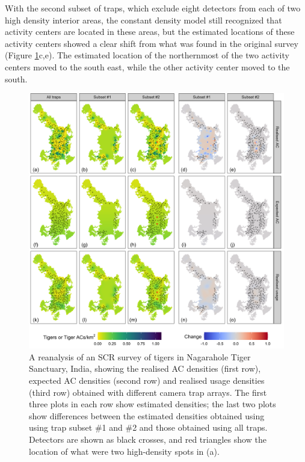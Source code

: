 \documentclass[useAMS,usenatbib,referee]{biom}
\begin{document}
With the second subset of traps, which exclude eight detectors from each of two high density interior areas, the constant density model still recognized that activity centers are located in these areas, but the estimated locations of these activity centers showed a clear shift from what was found in the original survey (Figure \ref{tigers}c,e). The estimated location of the northernmost of the two activity centers moved to the south east, while the other activity center moved to the south.

\begin{figure}[htbp]
\centering
\includegraphics[width=1\textwidth]{tiger_surfaces.png}
\caption{A reanalysis of an SCR survey of tigers in Nagarahole Tiger Sanctuary, India, showing the realised AC densities (first row), expected AC densities (second row) and realised usage densities (third row) obtained with different camera trap arrays. The first three plots in each row show estimated densities; the last two plots show differences between the estimated densities obtained using using trap subset \#1 and \#2 and those obtained using all traps. Detectors are shown as black crosses, and red triangles show the location of what were two high-density spots in (a).}
\label{tigers}
\end{figure}
\end{document}

